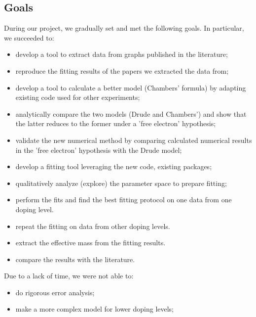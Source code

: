 \subsection{Goals}
During our project, we gradually set and met the following goals. In particular, we succeeded to: 
\begin{itemize}
	\item develop a tool to extract data from graphs published in the literature;
	\item reproduce the fitting results of the papers we extracted the data from;
	\item develop a tool to calculate a better model (Chambers' formula) by adapting existing code used for other experiments;
	\item analytically compare the two models (Drude and Chambers') and show that the latter reduces to the former under a 'free electron' hypothesis;
	\item validate the new numerical method by comparing calculated numerical results in the 'free electron' hypothesis with the Drude model;
	\item develop a fitting tool leveraging the new code, existing packages;
	\item qualitatively analyze (explore) the parameter space to prepare fitting;
	\item perform the fits and find the best fitting protocol on one data from one doping level.
	\item repeat the fitting on data from other doping levels.
	\item extract the effective mass from the fitting results.
	\item compare the results with the literature.
\end{itemize}
Due to a lack of time, we were not able to:
\begin{itemize}
	\item do rigorous error analysis;
	\item make a more complex model for lower doping levels;
\end{itemize}